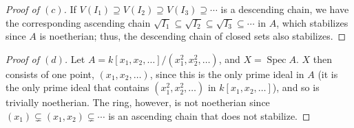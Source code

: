 \documentclass[12pt,letterpaper]{article}
\theoremstyle{definition}
\theoremstyle{remark}
\numberwithin{equation}{section}
\numberwithin{figure}{problem}
\DeclareMathOperator{\Spec}{Spec}
\begin{document}
\begin{proof}[Proof of $(c)$]
  If $V(I_1) \supseteq V(I_2) \supseteq V(I_3) \supseteq \cdots$ is a descending chain, we have the corresponding ascending chain $\sqrt{I_1} \subseteq \sqrt{I_2} \subseteq \sqrt{I_3} \subseteq \cdots$ in $A$, which stabilizes since $A$ is noetherian; thus, the descending chain of closed sets also stabilizes.
\end{proof}
\begin{proof}[Proof of $(d)$]
  Let $A = k[x_1,x_2,\ldots]/(x_1^2,x_2^2,\ldots)$, and $X = \Spec A$. $X$ then consists of one point, $(x_1,x_2,\ldots)$, since this is the only prime ideal in $A$ (it is the only prime ideal that contains $(x_1^2,x_2^2,\ldots)$ in $k[x_1,x_2,\ldots]$), and so is trivially noetherian. The ring, however, is not noetherian since $(x_1) \subsetneq (x_1,x_2) \subsetneq \cdots$ is an ascending chain that does not stabilize.
\end{proof}
\end{document}
